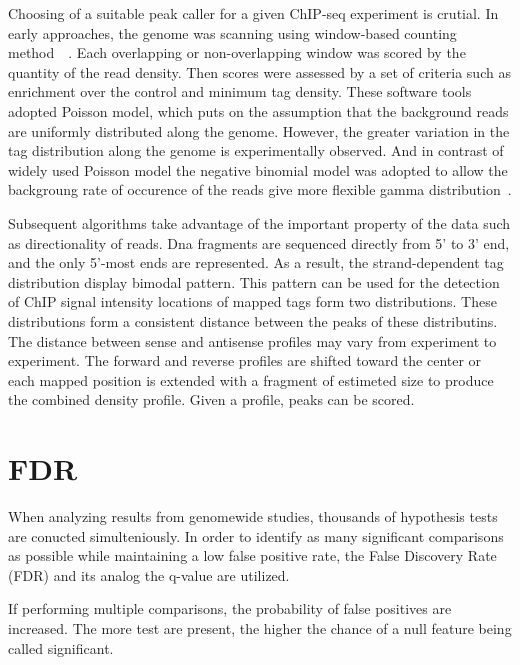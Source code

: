 Choosing of a suitable peak caller for a given ChIP-seq experiment is crutial.
In early approaches, the genome was scanning using window-based counting method~\cite{Zang-2009}~\cite{Xu-2010}.
Each overlapping or non-overlapping window was scored by the quantity of the read density. 
Then scores were assessed by a set of criteria such as enrichment over the control and minimum tag density.
These software tools adopted Poisson model, which puts on the assumption that the background reads are uniformly distributed along the genome.
However, the greater variation in the tag distribution along the genome is experimentally observed.
And in contrast of widely used Poisson model the negative binomial model was adopted to allow the backgroung rate of occurence of the reads give more flexible gamma distribution~\cite{ji2008integrated}.

Subsequent algorithms take advantage of the important property of the data such as directionality of reads.
Dna fragments are sequenced directly from 5' to 3' end, and the only 5'-most ends are represented.
As a result, the strand-dependent tag distribution display bimodal pattern.
This pattern can be used for the detection of ChIP signal intensity locations of mapped tags form two distributions.
These distributions form a consistent distance between the peaks of these distributins.
The distance between sense and antisense profiles may vary from experiment to experiment.
The forward and reverse profiles are shifted toward the center or each mapped position is extended with a fragment of estimeted size to produce the combined density profile.
Given a profile, peaks can be scored.

\section{FDR}

When analyzing results from genomewide studies, thousands of hypothesis tests are conucted simulteniously.
In order to identify as many significant comparisons as possible while maintaining a low false positive rate, the False Discovery Rate (FDR) and its analog the q-value are utilized.

If performing multiple comparisons, the probability of false positives are increased.
The more test are present, the higher the chance of a null feature being called significant.


